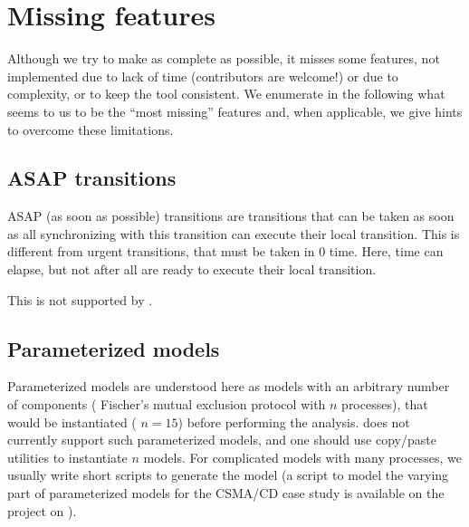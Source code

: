 \chapter{Missing features}

Although we try to make \imitator{} as complete as possible, it misses some features, not implemented due to lack of time (contributors are welcome!) or due to complexity, or to keep the tool consistent.
We enumerate in the following what seems to us to be the ``most missing'' features and, when applicable, we give hints to overcome these limitations.



\section{ASAP transitions}

ASAP (as soon as possible) transitions are transitions that can be taken as soon as all \IPTA{} synchronizing with this transition can execute their local transition.
This is different from urgent transitions, that must be taken in 0 time.
Here, time can elapse, but not after all \IPTA{} are ready to execute their local transition.

This is not supported by \imitator{}. %



\section{Parameterized models}

Parameterized models are understood here as models with an arbitrary number of components (\eg{} Fischer's mutual exclusion protocol with $n$ processes), that would be instantiated (\eg{} $n = 15$) before performing the analysis.
\imitator{} does not currently support such parameterized models, and one should use copy/paste utilities to instantiate $n$ models.
For complicated models with many processes, we usually write short scripts to generate the model (a script  to model the varying part of parameterized models for the CSMA/CD case study is available on the \imitator{} project on \GitHubIMI{}).




